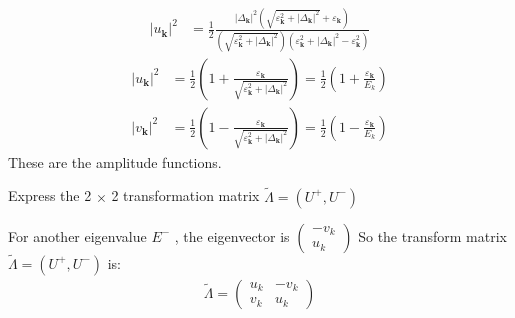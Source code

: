 \documentclass[answers]{exam}
\begin{document}
\begin{questions}
\begin{solution}
\begin{align*}
\left|u_{\mathbf{k}}\right|^{2} &=\frac{1}{2} \frac{\left|\Delta_{\mathbf{k}}\right|^{2}\left(\sqrt{\varepsilon _{\mathbf{k}}^{2}+\left|\Delta_{\mathbf{k}}\right|^{2}}+\varepsilon _{\mathbf{k}}\right)}{(\sqrt{\varepsilon _{\mathbf{k}}^{2}+\left|\Delta_{\mathbf{k}}\right|^{2}})\left(\varepsilon _{\mathbf{k}}^{2}+\left|\Delta_{\mathbf{k}}\right|^{2}-\varepsilon _{\mathbf{k}}^{2}\right)} 
\end{align*}
\begin{align*}
\left|u_{\mathbf{k}}\right|^{2} &=\frac{1}{2}\left(1+\frac{\varepsilon _{\mathbf{k}}}{\sqrt{\varepsilon _{\mathbf{k}}^{2}+\left|\Delta_{\mathbf{k}}\right|^{2}}}\right)=\frac{1}{2}\left(1+\frac{\varepsilon _{\mathbf{k}}}{E_{k}}\right)\\
\left|v_{\mathbf{k}}\right|^{2}&=\frac{1}{2}\left(1-\frac{\varepsilon _{\mathbf{k}}}{\sqrt{\varepsilon _{\mathbf{k}}^{2}+\left|\Delta_{\mathbf{k}}\right|^{2}}}\right)=\frac{1}{2}\left(1-\frac{\varepsilon _{\mathbf{k}}}{E_{k}}\right)
\end{align*}
These are the amplitude functions.
\end{solution}


\question Express the 2 $\times$ 2 transformation matrix $\tilde{\Lambda}=\left(U^{+}, U^{-}\right)$
\begin{solution}
For another eigenvalue $E^{-}$ , the eigenvector is $\left(\begin{array}{c}
-v_{k} \\u_{k}
\end{array}\right)$
So the transform matrix $\tilde{\Lambda}=\left(U^{+}, U^{-}\right)$ is:
\begin{align*}
\tilde{\Lambda}=\left(\begin{array}{cc}
u_{k} & -v_{ k} \\
v_{k} & u_{k}
\end{array}\right)   
\end{align*}
\end{solution}


\end{questions}
\end{document}
